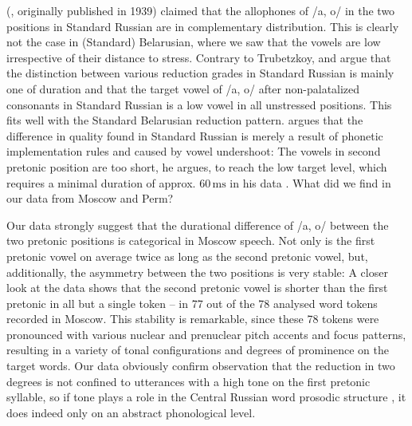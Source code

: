 \documentclass[output=paper,colorlinks,citecolor=black]{langscibook}
\begin{document}
\citeauthor{Trubetzkoy1969} (\citeyear{Trubetzkoy1969}, originally published in 1939) claimed that the allophones of /a, o/ in the two positions in Standard Russian are in complementary distribution. This is clearly not the case in (Standard) Belarusian, where we saw that the vowels are low irrespective of their distance to stress. Contrary to Trubetzkoy, \citet{Barnes2006} and \citet{Iosad2012} argue that the distinction between various reduction grades in Standard Russian is mainly one of duration \citep[531--532]{Iosad2012} and that the target vowel of /a, o/ after non-palatalized consonants in Standard Russian is a low vowel in all unstressed positions. This fits well with the Standard Belarusian reduction pattern. \citet{Barnes2006} argues that the difference in quality found in Standard Russian is merely a result of phonetic implementation rules and caused by vowel undershoot: The vowels in second pretonic position are too short, he argues, to reach the low target level, which requires a minimal duration of approx. $60\,\text{ms}$ in his data \citep{Barnes2006}. What did we find in our data from Moscow and Perm?

Our data strongly suggest that the durational difference of /a, o/ between the two pretonic positions is categorical in Moscow speech. Not only is the first pretonic vowel on average twice as long as the second pretonic vowel, but, additionally, the asymmetry between the two positions is very stable: A closer look at the data shows that the second pretonic vowel is shorter than the first pretonic in all but a single token -- in 77 out of the 78 analysed word tokens recorded in Moscow. This stability is remarkable, since these 78 tokens were pronounced with various nuclear and prenuclear pitch accents and focus patterns, resulting in a variety of tonal configurations and degrees of prominence on the target words. Our data obviously confirm  observation that the reduction in two degrees is not confined to utterances with a high tone on the first pretonic syllable, so if tone plays a role in the Central Russian word prosodic structure \citep{Dubina2012,Molczanow2015}, it does indeed only on an abstract phonological level.
\end{document}
